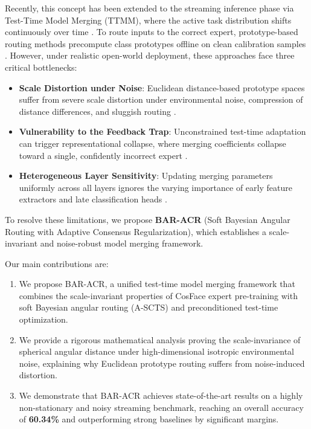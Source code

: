 \documentclass{article}
\theoremstyle{definition}
\theoremstyle{remark}
\begin{document}
Recently, this concept has been extended to the streaming inference phase via Test-Time Model Merging (TTMM), where the active task distribution shifts continuously over time \cite{lv2025_3, zhou2025_27}. To route inputs to the correct expert, prototype-based routing methods precompute class prototypes offline on clean calibration samples \cite{cui2025_30, zhang2025_31}. However, under realistic open-world deployment, these approaches face three critical bottlenecks:
\begin{itemize}
    \item \textbf{Scale Distortion under Noise}: Euclidean distance-based prototype spaces suffer from severe scale distortion under environmental noise, compression of distance differences, and sluggish routing \cite{boudiaf2022_33}.
    \item \textbf{Vulnerability to the Feedback Trap}: Unconstrained test-time adaptation can trigger representational collapse, where merging coefficients collapse toward a single, confidently incorrect expert \cite{döbler2022_34}.
    \item \textbf{Heterogeneous Layer Sensitivity}: Updating merging parameters uniformly across all layers ignores the varying importance of early feature extractors and late classification heads \cite{seckler2022_53}.
\end{itemize}

To resolve these limitations, we propose \textbf{BAR-ACR} (Soft Bayesian Angular Routing with Adaptive Consensus Regularization), which establishes a scale-invariant and noise-robust model merging framework.

Our main contributions are:
\begin{enumerate}
    \item We propose BAR-ACR, a unified test-time model merging framework that combines the scale-invariant properties of CosFace expert pre-training with soft Bayesian angular routing (A-SCTS) and preconditioned test-time optimization.
    \item We provide a rigorous mathematical analysis proving the scale-invariance of spherical angular distance under high-dimensional isotropic environmental noise, explaining why Euclidean prototype routing suffers from noise-induced distortion.
    \item We demonstrate that BAR-ACR achieves state-of-the-art results on a highly non-stationary and noisy streaming benchmark, reaching an overall accuracy of \textbf{60.34\%} and outperforming strong baselines by significant margins.
\end{enumerate}
\end{document}
